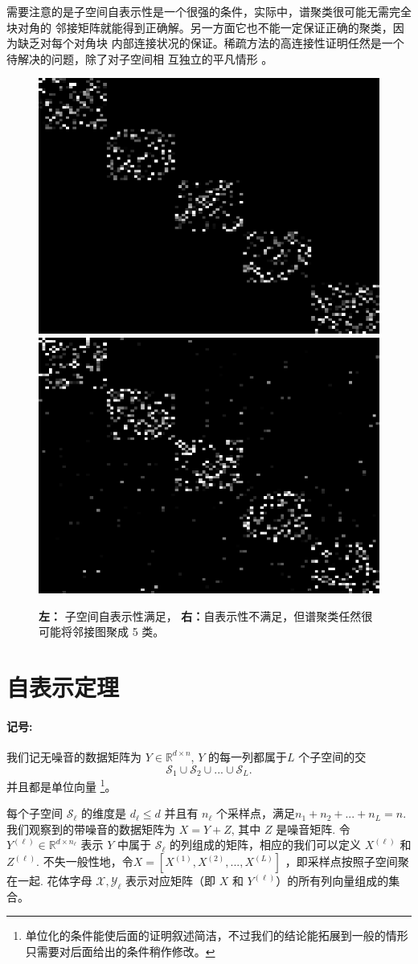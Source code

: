 \documentclass[main.tex]{subfiles}
\begin{document}
需要注意的是子空间自表示性是一个很强的条件，实际中，谱聚类很可能无需完全块对角的
邻接矩阵就能得到正确解。另一方面它也不能一定保证正确的聚类，因为缺乏对每个对角块
内部连接状况的保证。稀疏方法的高连接性证明任然是一个待解决的问题，除了对子空间相
互独立的平凡情形 \cite{liu2013LRR, wang2013provable}。

\begin{figure}
  \centering
  \includegraphics[width=0.35\linewidth]{pics/SEP.png}
  \includegraphics[width=0.35\linewidth]{pics/ViolateSEP.png}\\
  \caption{\textbf{左：} 子空间自表示性满足， \textbf{右：}自表示性不满足，但谱聚类任然很可能将邻接图聚成 5 类。}
  \label{fig:SEP}
\end{figure}

\section{自表示定理}
\paragraph{记号: }
我们记无噪音的数据矩阵为 $Y \in \mathbb{R}^{d\times n}$,  $Y$ 的每一列都属于$L$
个子空间的交
$$\mathcal{S}_1 \cup \mathcal{S}_2 \cup...\cup \mathcal{S}_L.$$
并且都是单位向量
\footnote{单位化的条件能使后面的证明叙述简洁，不过我们的结论能拓展到一般的情形只需要对后面给出的条件稍作修改。}。

每个子空间 $\mathcal{S}_{\ell}$ 的维度是 $d_{\ell} \le d$ 并且有 $n_{\ell}$
个采样点，满足$n_1 +n_2+...+n_L=n$. 我们观察到的带噪音的数据矩阵为 $X = Y+Z$,
其中 $Z$ 是噪音矩阵. 令 $Y^{(\ell)}\in \mathbb{R}^{d\times n_{\ell}}$ 表示 
$Y$ 中属于 $\mathcal{S}_{\ell}$ 的列组成的矩阵，相应的我们可以定义 $X^{(\ell)}$ 和 $Z^{(\ell)}$.
不失一般性地，令$X=[X^{(1)},X^{(2)},...,X^{(L)}]$ ，即采样点按照子空间聚在一起.
花体字母 $\mathcal{X},\mathcal{Y_{\ell}}$ 表示对应矩阵（即 $X$ 和 $Y^{(\ell)}$）的所有列向量组成的集合。
\end{document}
